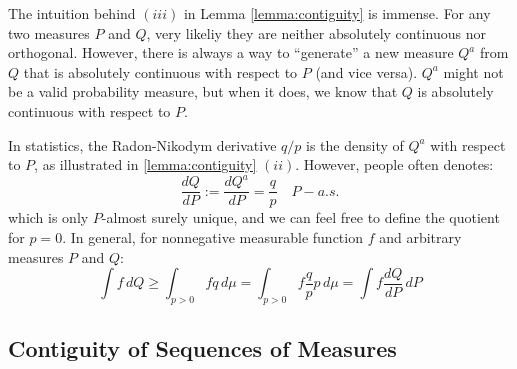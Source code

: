 \documentclass{article}
\begin{document}
The intuition behind $(iii)$ in Lemma \ref{lemma:contiguity} is immense. For any two measures $P$ and $Q$, very likeliy they are neither absolutely continuous nor orthogonal. However, there is always a way to ``generate'' a new measure $Q^a$ from $Q$ that is absolutely continuous with respect to $P$ (and vice versa). $Q^a$ might not be a valid probability measure, but when it does, we know that $Q$ is absolutely continuous with respect to $P$.

In statistics, the Radon-Nikodym derivative $q/p$ is the density of $Q^a$ with respect to $P$, as illustrated in \ref{lemma:contiguity} $(ii)$. However, people often denotes:
\begin{equation}
    \frac{dQ}{dP} := \frac{dQ^a}{dP} = \frac{q}{p} \quad P - a.s.
\end{equation}
which is only $P$-almost surely unique, and we can feel free to define the quotient for $p = 0$. In general, for nonnegative measurable function $f$ and arbitrary measures $P$ and $Q$:
\begin{equation}
    \int f \, dQ \geq \int_{p>0} f q \, d\mu = \int_{p>0} f \frac{q}{p} p \, d\mu = \int f \frac{dQ}{dP} \, dP
\end{equation}

\subsection{Contiguity of Sequences of Measures}
\end{document}
